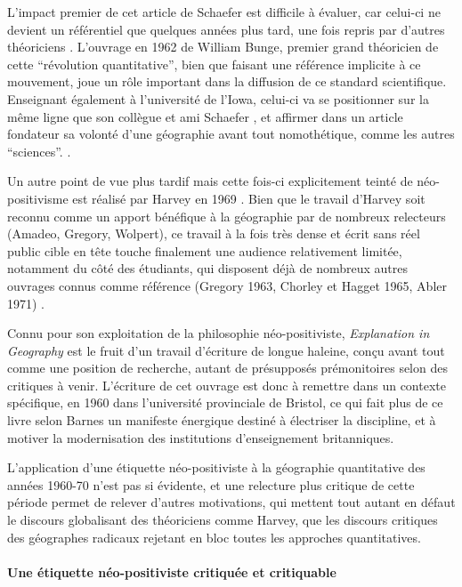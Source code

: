 L'impact premier de cet article de Schaefer est difficile à évaluer, car celui-ci ne devient un référentiel que quelques années plus tard, une fois repris par d'autres théoriciens \autocite[32]{Gregory1978}. L'ouvrage en 1962 de William Bunge, premier grand théoricien de cette \enquote{révolution quantitative}, bien que faisant une référence implicite à ce mouvement, joue un rôle important dans la diffusion de ce standard scientifique. Enseignant également à l'université de l'Iowa, celui-ci va se positionner sur la même ligne que son collègue et ami Schaefer \autocite{Goodchild2001}, et affirmer dans un article fondateur \autocite{Bunge1962} sa volonté d'une géographie avant tout nomothétique, comme les autres \enquote{sciences}. \autocites{Bunge1979, Claval2003}[429-430]{Gregory2009}.

Un autre point de vue plus tardif mais cette fois-ci explicitement teinté de néo-positivisme est réalisé par Harvey en 1969 \autocite{Harvey1969}. Bien que le travail d'Harvey soit reconnu comme un apport bénéfique à la géographie par de nombreux relecteurs (Amadeo, Gregory, Wolpert), ce travail à la fois très dense et écrit sans réel public cible en tête touche finalement une audience relativement limitée, notamment du côté des étudiants, qui disposent déjà de nombreux autres ouvrages connus comme référence (Gregory 1963, Chorley et Hagget 1965, Abler 1971) \autocite{Johnston2008}.

Connu pour son exploitation de la philosophie néo-positiviste, \textit{Explanation in Geography} est le fruit d'un travail d'écriture de longue haleine, conçu avant tout comme une position de recherche, autant de présupposés prémonitoires selon \textcite[47]{Barnes2006b} des critiques à venir. L'écriture de cet ouvrage est donc à remettre dans un contexte spécifique, en 1960 dans l'université provinciale de Bristol, ce qui fait plus de ce livre selon Barnes \autocite[31-36]{Barnes2006b} un manifeste énergique destiné à électriser la discipline, et à motiver la modernisation des institutions d'enseignement britanniques.

L'application d'une étiquette néo-positiviste à la géographie quantitative des années 1960-70 n'est pas si évidente, et une relecture plus critique de cette période permet de relever d'autres motivations, qui mettent tout autant en défaut le discours globalisant des théoriciens comme Harvey, que les discours critiques des géographes radicaux rejetant en bloc toutes les approches quantitatives.

\paragraph{Une étiquette néo-positiviste critiquée et critiquable}
\label{p:etiquette_neopositiviste}

